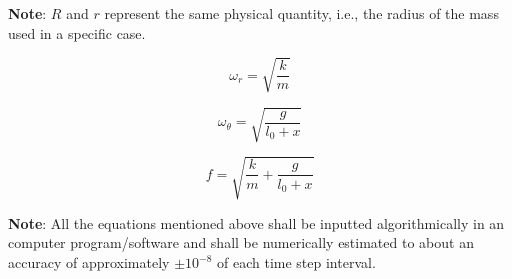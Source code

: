         {\textbf{Note}: $R$ and $r$ represent the same physical quantity, i.e., the radius of the mass used in a specific case.}
            
    \begin{equation}
        \omega_r = \sqrt{\frac{k}{m}}
        \label{eq5}
    \end{equation}
            
    \begin{equation}
        \omega_\theta = \sqrt{\frac{g}{l_0 + x}}
        \label{eq6}
    \end{equation}
            
    \begin{equation}
        f = \sqrt{\frac{k}{m} + \frac{g}{l_0 + x}}
        \label{eq7}
    \end{equation}
            
{\textbf{Note}: All the equations mentioned above shall be inputted algorithmically in an computer program/software and shall be numerically estimated to about an accuracy of approximately $\pm10^{-8}$ of each time step interval.}
            
            




